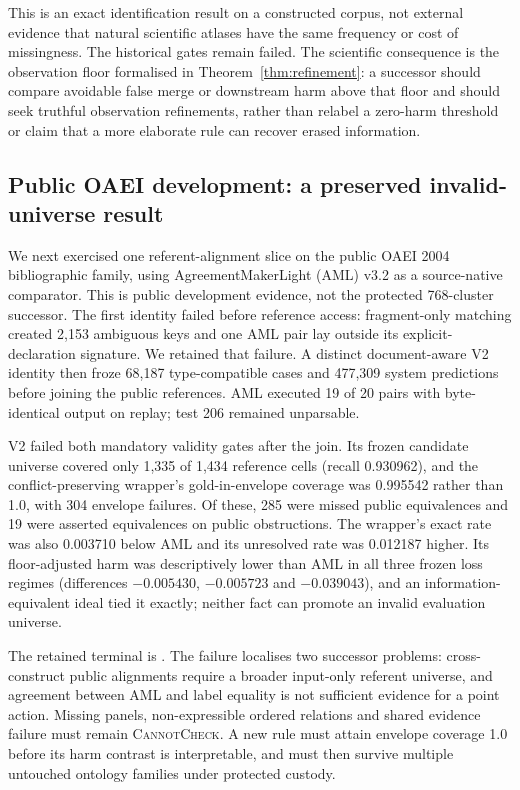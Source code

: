 This is an exact identification result on a constructed corpus, not external
evidence that natural scientific atlases have the same frequency or cost of
missingness. The historical gates remain failed. The scientific consequence
is the observation floor formalised in Theorem~\ref{thm:refinement}: a
successor should compare avoidable false merge or downstream harm above that
floor and should seek truthful observation refinements, rather than relabel a
zero-harm threshold or claim that a more elaborate rule can recover erased
information.

\subsection{Public OAEI development: a preserved invalid-universe result}

We next exercised one referent-alignment slice on the public OAEI 2004
bibliographic family, using AgreementMakerLight (AML) v3.2 as a source-native
comparator.  This is public development evidence, not the protected
768-cluster successor.  The first identity failed before reference access:
fragment-only matching created 2,153 ambiguous keys and one AML pair lay
outside its explicit-declaration signature.  We retained that failure.  A
distinct document-aware V2 identity then froze 68,187 type-compatible cases
and 477,309 system predictions before joining the public references.  AML
executed 19 of 20 pairs with byte-identical output on replay; test 206 remained
unparsable.

V2 failed both mandatory validity gates after the join.  Its frozen candidate
universe covered only 1,335 of 1,434 reference cells (recall 0.930962), and the
conflict-preserving wrapper's gold-in-envelope coverage was 0.995542 rather
than 1.0, with 304 envelope failures.  Of these, 285 were missed public
equivalences and 19 were asserted equivalences on public obstructions.  The
wrapper's exact rate was also 0.003710 below AML and its unresolved rate was
0.012187 higher.  Its floor-adjusted harm was descriptively lower than AML in
all three frozen loss regimes (differences $-0.005430$, $-0.005723$ and
$-0.039043$), and an information-equivalent ideal tied it exactly; neither fact
can promote an invalid evaluation universe.

The retained terminal is
.
The failure localises two successor problems: cross-construct public alignments
require a broader input-only referent universe, and agreement between AML and
label equality is not sufficient evidence for a point action.  Missing panels,
non-expressible ordered relations and shared evidence failure must remain
\textsc{CannotCheck}.  A new rule must attain envelope coverage 1.0 before its
harm contrast is interpretable, and must then survive multiple untouched
ontology families under protected custody.

